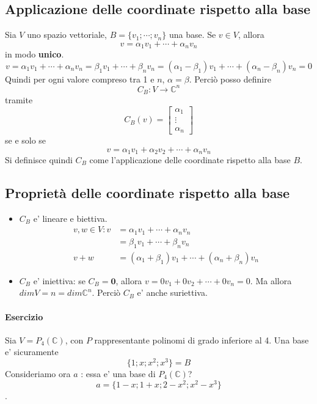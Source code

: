 \documentclass[a4paper, 10pt]{article}
\begin{document}
	  \subsection{Applicazione delle coordinate rispetto alla base}
	  Sia $V$ uno spazio vettoriale, $B = \lbrace v_1; \cdots; v_n \rbrace$ una base. Se $v \in V$, allora 
	  \[v = \alpha_1 v_1 + \cdots + \alpha_n v_n \] in modo \textbf{unico}. 
	  \[ v = \alpha_1 v_1 + \cdots + \alpha_n v_n = \beta_1 v_1 + \cdots + \beta_n v_n  = 
	  (\alpha_1 - \beta_1)v_1 + \cdots + (\alpha_n - \beta_n) v_n = 0\] 
	  Quindi per ogni valore compreso tra 1 e $n$,  $\alpha = \beta$. Perciò posso definire
	  \[ C_B : V \rightarrow \mathbb{C}^n \] tramite 
	  \[C_B(v) = \begin{bmatrix} \alpha_1 \\ \vdots \\ \alpha_n \end{bmatrix} \] se e solo se 
	  \[ v = \alpha_1 v_1 + \alpha_2 v_2 + \cdots + \alpha_n v_n \]
	  Si definisce quindi $C_B$ come l'applicazione delle coordinate rispetto alla base $B$.
	  
	  \subsection{Proprietà delle coordinate rispetto alla base}
	  \begin{itemize}
	  	\item $C_B$ e' lineare e biettiva. 
	  		\begin{equation*}
	  			\begin{split}
	  				v,w \in V: v &= \alpha_1 v_1 + \cdots + \alpha_n v_n \\
	  				&= \beta_1 v_1 + \cdots + \beta_n v_n \\
	  				v + w &= (\alpha_1 + \beta_1) v_1 + \cdots + (\alpha_n + \beta_n)v_n   
	  			\end{split} 
	  		\end{equation*} 
	  	\item $C_B$ e' iniettiva: se $C_B = \textbf{0}$, allora $v = 0v_1 + 0v_2 + \cdots + 0v_n = 0$. 
	  		 Ma allora $dimV = n = dim\mathbb{C}^n$. Perciò $C_B$ e' anche suriettiva.
	  \end{itemize}
	  
	  \paragraph*{Esercizio}
	  Sia $V = P_4(\mathbb{C})$, con $P$ rappresentante polinomi di grado inferiore al 4. Una base e' sicuramente 
	  \[ \lbrace 1; x ; x^2; x^3 \rbrace = B \] Consideriamo ora $a$ : essa e' una base di $P_4(\mathbb{C})$?
	  \[ a = \lbrace 1-x; 1 + x; 2 - x^2; x^2 - x^3 \rbrace \].
\end{document}
